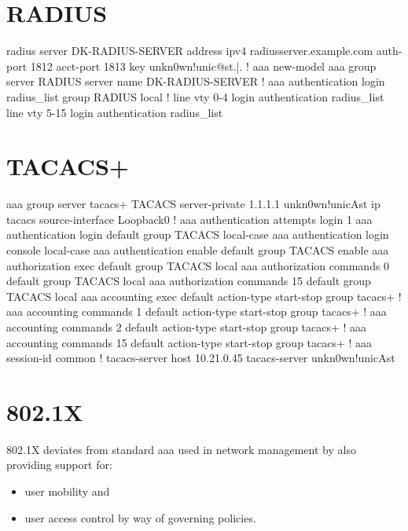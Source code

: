 \newpage

\section{RADIUS}


\begin{txt}
	radius server DK-RADIUS-SERVER
	address ipv4 radiusserver.example.com auth-port 1812 acct-port 1813
	key unkn0wn!unic@st.|.
	!
	aaa new-model
	aaa group server RADIUS
	server name DK-RADIUS-SERVER
	!
	aaa authentication login radius_list group RADIUS local
	!
	line vty 0-4
	login authentication radius_list
	line vty 5-15
	login authentication radius_list
\end{txt}

\newpage

\section{TACACS+}


\begin{txt}
	aaa group server tacacs+ TACACS
	server-private 1.1.1.1 unkn0wn!unicAst
	ip tacacs source-interface Loopback0
	!
	aaa authentication attempts login 1
	aaa authentication login default group TACACS local-case
	aaa authentication login console local-case
	aaa authentication enable default group TACACS enable
	aaa authorization exec default group TACACS local 
	aaa authorization commands 0 default group TACACS local 
	aaa authorization commands 15 default group TACACS local 
	aaa accounting exec default
	action-type start-stop
	group tacacs+
	!
	aaa accounting commands 1 default
	action-type start-stop
	group tacacs+
	!
	aaa accounting commands 2 default
	action-type start-stop
	group tacacs+
	!
	aaa accounting commands 15 default
	action-type start-stop
	group tacacs+
	!
	aaa session-id common
	!
	tacacs-server host 10.21.0.45
	tacacs-server unkn0wn!unicAst
\end{txt}

\section{802.1X}

802.1X deviates from standard \gls{aaa} used in network management by also providing support for:
\begin{itemize}
	\item user mobility and
	\item user access control by way of governing policies.
\end{itemize}

